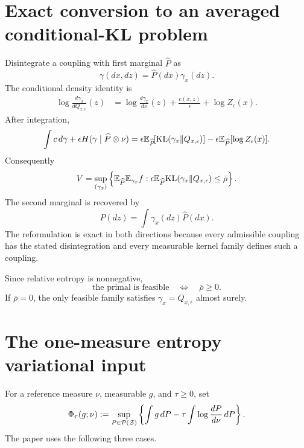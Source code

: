 \section{Exact conversion to an averaged conditional-KL problem}
Disintegrate a coupling with first marginal $\widehat P$ as
\[
 \gamma(dx,dz)=\widehat P(dx)\gamma_x(dz).
\]
The conditional density identity is
\begin{align*}
 \log\frac{d\gamma_x}{dQ_{x,\epsilon}}(z)
 &=\log\frac{d\gamma_x}{d\nu}(z)
   +\frac{c(x,z)}\epsilon+\log Z_\epsilon(x).
\end{align*}
After integration,
\begin{equation}\label{eq:WGX-recenter}
 \int c\,d\gamma
 +\epsilon H(\gamma\mid\widehat P\otimes\nu)
 =\epsilon\mathbb{E}_{\widehat P}\!
   [\mathrm{KL}(\gamma_x\|Q_{x,\epsilon})]
 -\epsilon\mathbb{E}_{\widehat P}[\log Z_\epsilon(x)].
\end{equation}
Consequently
\begin{equation}\label{eq:WGX-KL-primal}
 V=\sup_{(\gamma_x)}
 \left\{
 \mathbb{E}_{\widehat P}\mathbb{E}_{\gamma_x}f:
 \epsilon\mathbb{E}_{\widehat P}\mathrm{KL}(\gamma_x\|Q_{x,\epsilon})\le\bar\rho
 \right\}.
\end{equation}
The second marginal is recovered by
\[
 P(dz)=\int\gamma_x(dz)\widehat P(dx).
\]
The reformulation is exact in both directions because every admissible coupling has the stated disintegration and every measurable kernel family defines such a coupling.

Since relative entropy is nonnegative,
\begin{equation}\label{eq:WGX-feasibility}
 \text{the primal is feasible}\quad\Longleftrightarrow\quad\bar\rho\ge0.
\end{equation}
If $\bar\rho=0$, the only feasible family satisfies $\gamma_x=Q_{x,\epsilon}$ almost surely.

\section{The one-measure entropy variational input}
For a reference measure $\nu$, measurable $g$, and $\tau\ge0$, set
\[
 \Phi_\tau(g;\nu)
 :=\sup_{P\in\mathcal{P}(\mathcal Z)}
 \left\{\int g\,dP-\tau\int\log\frac{dP}{d\nu}\,dP\right\}.
\]
The paper uses the following three cases.

